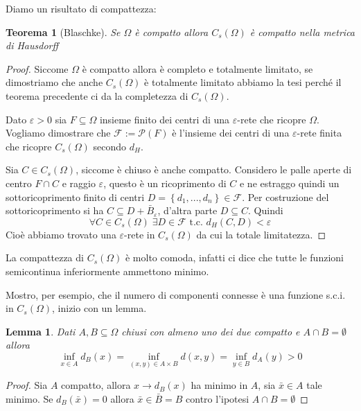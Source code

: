 \documentclass[a4paper,10pt]{article}
\newcounter{counter1}
\theoremstyle{plain}
\newtheorem{myteo}[counter1]{Teorema}
\newtheorem{mylem}[counter1]{Lemma}
\theoremstyle{definition}
\theoremstyle{remark}
\newcommand{\set}[1]{\left\{#1\right\}}
\begin{document}
Diamo un risultato di compattezza:
\begin{myteo}[Blaschke{\cite[Teorema 4.4.6]{ambrosio2000selected}}]
  \label{teo:spazioformecompatto}
  Se $\Omega$ è compatto allora $C_s(\Omega)$ è compatto nella metrica
  di Hausdorff
\end{myteo}
\begin{proof}
  Siccome $\Omega$ è compatto allora è completo e totalmente limitato,
  se dimostriamo che anche $C_s(\Omega)$ è totalmente limitato abbiamo
  la tesi perché il teorema precedente ci da la completezza di
  $C_s(\Omega)$.

  Dato $\varepsilon >0$ sia $F\subseteq \Omega$ insieme finito dei centri di
  una $\varepsilon$-rete che ricopre $\Omega$. Vogliamo dimostrare che
  $\mathcal{F}:= \mathcal{P}(F)$ è l'insieme dei centri di una
  $\varepsilon$-rete finita che ricopre $C_s(\Omega)$ secondo $d_H$.

  Sia $C\in C_s(\Omega)$, siccome è chiuso è anche compatto. Considero
  le palle aperte di centro $F\cap C$ e raggio $\varepsilon$, questo è
  un ricoprimento di $C$ e ne estraggo quindi un sottoricoprimento
  finito di centri $D=\set{d_1,...,d_n} \in \mathcal{F}$. Per
  costruzione del sottoricoprimento si ha $C \subseteq D +
  \bar B_\varepsilon$, d'altra parte $D \subseteq C$. Quindi
  \[ \forall C \in C_s(\Omega)\; \exists D \in \mathcal{F}\text{ t.c. }
  d_H(C,D) < \varepsilon \]
  Cioè abbiamo trovato una $\varepsilon$-rete in $C_s(\Omega)$ da cui la
  totale limitatezza.
\end{proof}

La compattezza di $C_s(\Omega)$ è molto comoda, infatti ci dice che
tutte le funzioni semicontinua inferiormente ammettono minimo.

Mostro, per esempio, che il numero di componenti connesse è una
funzione s.c.i. in $C_s(\Omega)$, inizio con un lemma.

\begin{mylem}
  Dati $A,B \subseteq \Omega$ chiusi con almeno uno dei due compatto e
  $A \cap B = \emptyset$ allora
  \[ \inf _{x\in A} d_B(x) = \inf _{(x,y) \in A\times B} d(x,y) = \inf
  _{y\in B} d_A(y) >0 \]
\end{mylem}
\begin{proof}
  Sia $A$ compatto, allora $x \to d_B(x)$ ha minimo in $A$, sia $\bar
  x \in A$ tale minimo. Se $d_B(\bar x) = 0$ allora $\bar x \in \bar B = B$
  contro l'ipotesi $A \cap B = \emptyset$
\end{proof}
\end{document}

